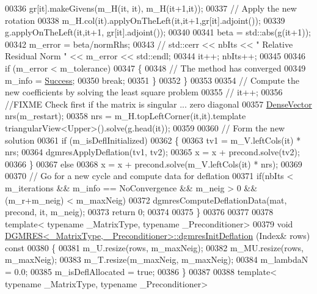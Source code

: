 \begin{DoxyCode}
00336     gr[it].makeGivens(m\_H(it, it), m\_H(it+1,it)); 
00337     \textcolor{comment}{// Apply the new rotation}
00338     m\_H.col(it).applyOnTheLeft(it,it+1,gr[it].adjoint());
00339     g.applyOnTheLeft(it,it+1, gr[it].adjoint()); 
00340     
00341     beta = std::abs(g(it+1));
00342     m\_error = beta/normRhs; 
00343     \textcolor{comment}{// std::cerr << nbIts << " Relative Residual Norm " << m\_error << std::endl;}
00344     it++; nbIts++; 
00345     
00346     \textcolor{keywordflow}{if} (m\_error < m\_tolerance)
00347     \{
00348       \textcolor{comment}{// The method has converged}
00349       m\_info = \hyperlink{group__enums_gga85fad7b87587764e5cf6b513a9e0ee5ea52581b035f4b59c203b8ff999ef5fcea}{Success};
00350       \textcolor{keywordflow}{break};
00351     \}
00352   \}
00353   
00354   \textcolor{comment}{// Compute the new coefficients by solving the least square problem}
00355 \textcolor{comment}{//   it++;}
00356   \textcolor{comment}{//FIXME  Check first if the matrix is singular ... zero diagonal}
00357   \hyperlink{group___core___module}{DenseVector} nrs(m\_restart); 
00358   nrs = m\_H.topLeftCorner(it,it).template triangularView<Upper>().solve(g.head(it)); 
00359   
00360   \textcolor{comment}{// Form the new solution}
00361   \textcolor{keywordflow}{if} (m\_isDeflInitialized)
00362   \{
00363     tv1 = m\_V.leftCols(it) * nrs; 
00364     dgmresApplyDeflation(tv1, tv2); 
00365     x = x + precond.solve(tv2);
00366   \}
00367   \textcolor{keywordflow}{else}
00368     x = x + precond.solve(m\_V.leftCols(it) * nrs); 
00369   
00370   \textcolor{comment}{// Go for a new cycle and compute data for deflation}
00371   \textcolor{keywordflow}{if}(nbIts < m\_iterations && m\_info == NoConvergence && m\_neig > 0 && (m\_r+m\_neig) < m\_maxNeig)
00372     dgmresComputeDeflationData(mat, precond, it, m\_neig); 
00373   \textcolor{keywordflow}{return} 0; 
00374   
00375 \}
00376 
00377 
00378 \textcolor{keyword}{template}< \textcolor{keyword}{typename} \_MatrixType, \textcolor{keyword}{typename} \_Preconditioner>
00379 \textcolor{keywordtype}{void} \hyperlink{class_eigen_1_1_d_g_m_r_e_s}{DGMRES<\_MatrixType, \_Preconditioner>::dgmresInitDeflation}
      (Index& rows)\textcolor{keyword}{ const}
00380 \textcolor{keyword}{}\{
00381   m\_U.resize(rows, m\_maxNeig);
00382   m\_MU.resize(rows, m\_maxNeig); 
00383   m\_T.resize(m\_maxNeig, m\_maxNeig);
00384   m\_lambdaN = 0.0; 
00385   m\_isDeflAllocated = \textcolor{keyword}{true}; 
00386 \}
00387 
00388 \textcolor{keyword}{template}< \textcolor{keyword}{typename} \_MatrixType, \textcolor{keyword}{typename} \_Preconditioner>

\end{DoxyCode}
